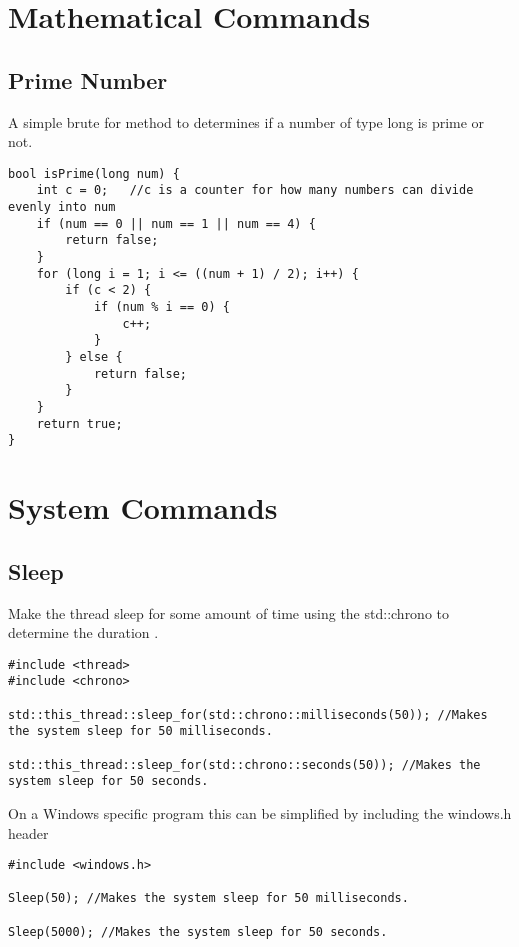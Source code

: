 \section{Mathematical Commands}

\subsection*{Prime Number}
A simple brute for method to determines if a number of type long is prime or not.
\begin{lstlisting}
bool isPrime(long num) {  
	int c = 0;   //c is a counter for how many numbers can divide evenly into num
	if (num == 0 || num == 1 || num == 4) {
		return false;
	}
	for (long i = 1; i <= ((num + 1) / 2); i++) {
		if (c < 2) {
			if (num % i == 0) {
				c++;
			}
		} else {
			return false;
		}
	}
	return true;
}
\end{lstlisting}















\section{System Commands}

\subsection*{Sleep}
Make the thread sleep for some amount of time using the std::chrono to determine the duration \cite{cpp:chrono}.
\begin{lstlisting}
#include <thread>
#include <chrono>

std::this_thread::sleep_for(std::chrono::milliseconds(50)); //Makes the system sleep for 50 milliseconds.

std::this_thread::sleep_for(std::chrono::seconds(50)); //Makes the system sleep for 50 seconds.
\end{lstlisting}

On a Windows specific program this can be simplified by including the windows.h header
\begin{lstlisting}
#include <windows.h>

Sleep(50); //Makes the system sleep for 50 milliseconds.

Sleep(5000); //Makes the system sleep for 50 seconds.
\end{lstlisting}














